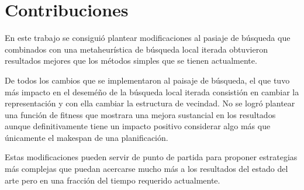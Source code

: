 \section{Contribuciones}
En este trabajo se consiguió plantear modificaciones al pasiaje de búsqueda que combinados con una metaheurística de búsqueda local iterada obtuvieron resultados mejores que los métodos simples que se tienen actualmente. 

De todos los cambios que se implementaron al paisaje de búsqueda, el que tuvo más impacto en el deseméño de la búsqueda local iterada consistión en cambiar la representación y con ella cambiar la estructura de vecindad. No se logró plantear una función de fitness que mostrara una mejora sustancial en los resultados aunque definitivamente tiene un impacto positivo considerar algo más que únicamente el makespan de una planificación.

Estas modificaciones pueden servir de punto de partida para proponer estrategias más complejas que puedan acercarse mucho más a los resultados del estado del arte pero en una fracción del tiempo requerido actualmente.


